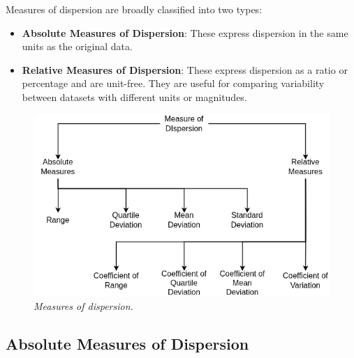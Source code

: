 \documentclass[twoside]{book}
\begin{document}
Measures of dispersion are broadly classified into two types:
\begin{itemize}
    \item \textbf{Absolute Measures of Dispersion}: These express dispersion in the same units as the original data.
    \item \textbf{Relative Measures of Dispersion}: These express dispersion as a ratio or percentage and are unit-free. They are useful for comparing variability between datasets with different units or magnitudes.
\end{itemize}

\begin{figure}[H]
\begin{center}
    \includegraphics[scale=0.55]{pic/mod.drawio.png}
\end{center}
\caption{\textit{Measures of dispersion.}}
\end{figure}

\subsection{Absolute Measures of Dispersion}
\end{document}
